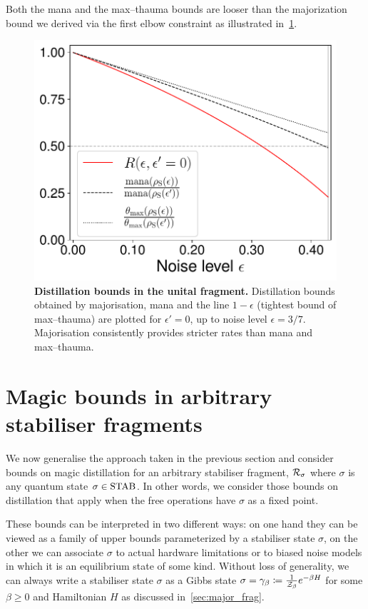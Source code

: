 \documentclass[pra,
aps,
twocolumn,
superscriptaddress,
groupedaddress,
nofootinbib,
reprint
]{revtex4-1}
\begin{document}
Both the mana and the max--thauma bounds are looser than the majorization bound we derived via the first elbow constraint as illustrated in~\cref{fig:distill_bounds}.
\begin{figure}[t]
    \centering
    \includegraphics[scale=0.5]{figs/distill_bounds.pdf}
    \caption{\textbf{Distillation bounds in the unital fragment.} Distillation bounds obtained by majorisation, mana and the line $1-\epsilon$ (tightest bound of max--thauma) are plotted for $\epsilon' = 0$, up to noise level $\epsilon = 3/7$.
    Majorisation consistently provides stricter rates than mana and max--thauma.
    }
    \label{fig:distill_bounds}
\end{figure}

\section{Magic bounds in arbitrary stabiliser fragments}
\label{sec:stab}

We now generalise the approach taken in the previous section and consider bounds on magic distillation for an arbitrary stabiliser fragment, $\mathcal{R}_\sigma$ where $\sigma$ is any quantum state $\sigma \in {\rm{STAB}}$.
In other words, we consider those bounds on distillation that apply when the free operations have $\sigma$ as a fixed point.

These bounds can be interpreted in two different ways: on one hand they can be viewed as a family of upper bounds parameterized by a stabiliser state $\sigma$, on the other we can associate $\sigma$ to actual hardware limitations or to biased noise models in which it is an equilibrium state of some kind. 
Without loss of generality, we can always write a stabiliser state $\sigma$ as a Gibbs state $\sigma = \gamma_\beta \coloneqq \frac{1}{\mathcal{Z}_\beta} e^{-\beta H}$ for some $\beta \geq 0$ and Hamiltonian $H$ as discussed in~\cref{sec:major_frag}.
\end{document}
